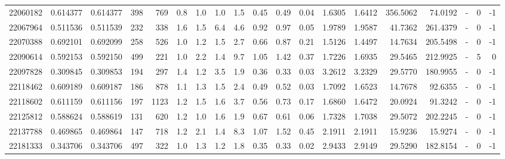 \begin{tabular}{rrrrrrrrrrrrrrrrlrr}
  22060182 & 0.614377 &   0.614377 &  398 &  769 &      0.8 &      1.0 &     1.0 &      1.5 &       0.45 &        0.49 &        0.04 &  1.6305 &  1.6412 &  356.5062 &   74.0192 &             - &        0 &         -1 \\
  22067964 & 0.511536 &   0.511539 &  232 &  338 &      1.6 &      1.5 &     6.4 &      4.6 &       0.92 &        0.97 &        0.05 &  1.9789 &  1.9587 &   41.7362 &  261.4379 &             - &        0 &         -1 \\
  22070388 & 0.692101 &   0.692099 &  258 &  526 &      1.0 &      1.2 &     1.5 &      2.7 &       0.66 &        0.87 &        0.21 &  1.5126 &  1.4497 &   14.7634 &  205.5498 &             - &        0 &         -1 \\
  22090614 & 0.592153 &   0.592150 &  499 &  221 &      1.0 &      2.2 &     1.4 &      9.7 &       1.05 &        1.42 &        0.37 &  1.7226 &  1.6935 &   29.5465 &  212.9925 &             - &        5 &          0 \\
  22097828 & 0.309845 &   0.309853 &  194 &  297 &      1.4 &      1.2 &     3.5 &      1.9 &       0.36 &        0.33 &        0.03 &  3.2612 &  3.2329 &   29.5770 &  180.9955 &             - &        0 &         -1 \\
  22118462 & 0.609189 &   0.609187 &  186 &  878 &      1.1 &      1.3 &     1.5 &      2.4 &       0.49 &        0.52 &        0.03 &  1.7092 &  1.6523 &   14.7678 &   92.6355 &             - &        0 &         -1 \\
  22118602 & 0.611159 &   0.611156 &  197 & 1123 &      1.2 &      1.5 &     1.6 &      3.7 &       0.56 &        0.73 &        0.17 &  1.6860 &  1.6472 &   20.0924 &   91.3242 &             - &        0 &         -1 \\
  22125812 & 0.588624 &   0.588619 &  131 &  620 &      1.2 &      1.0 &     1.6 &      1.9 &       0.67 &        0.61 &        0.06 &  1.7328 &  1.7038 &   29.5072 &  202.2245 &             - &        0 &         -1 \\
  22137788 & 0.469865 &   0.469864 &  147 &  718 &      1.2 &      2.1 &     1.4 &      8.3 &       1.07 &        1.52 &        0.45 &  2.1911 &  2.1911 &   15.9236 &   15.9274 &             - &        0 &         -1 \\
  22181333 & 0.343706 &   0.343706 &  497 &  322 &      1.0 &      1.3 &     1.2 &      1.8 &       0.35 &        0.33 &        0.02 &  2.9433 &  2.9149 &   29.5290 &  182.8154 &             - &        0 &         -1 \\

\end{tabular}
